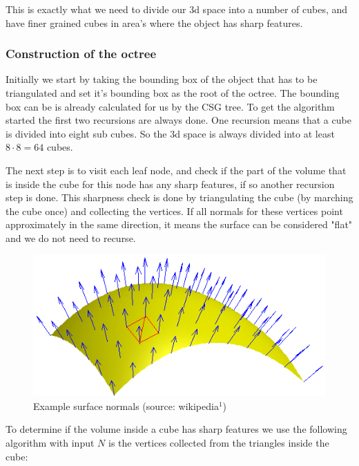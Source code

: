\documentclass[a4wide,10pt,twocolumn]{article}
\begin{document}
This is exactly what we need to divide our 3d space into a number of cubes, and have finer grained cubes in area's where the object has sharp features.

\subsubsection{Construction of the octree}
\label{sect:genoctree}
Initially we start by taking the bounding box of the object that has to be triangulated and set it's bounding box as the root of the octree. The bounding box can be is already calculated for us by the CSG tree. To get the algorithm started the first two recursions are always done. One recursion means that a cube is divided into eight sub cubes. So the 3d space is always divided into at least $8 \cdot 8 = 64$ cubes.

The next step is to visit each leaf node, and check if the part of the volume that is inside the cube for this node has any sharp features, if so another recursion step is done. This sharpness check is done by triangulating the cube (by marching the cube once) and collecting the vertices. If all normals for these vertices point approximately in the same direction, it means the surface can be considered "flat" and we do not need to recurse.

    \begin{figure}[h]
        \begin{center}
            \includegraphics[scale=0.4]{./images/Surface_normal}
        \end{center}
        \caption{Example surface normals (source: wikipedia$^1$)}
        \label{figure:surface_normal}
    \end{figure}

To determine if the volume inside a cube has sharp features we use the following algorithm with input $N$ is the vertices collected from the triangles inside the cube:
\end{document}
